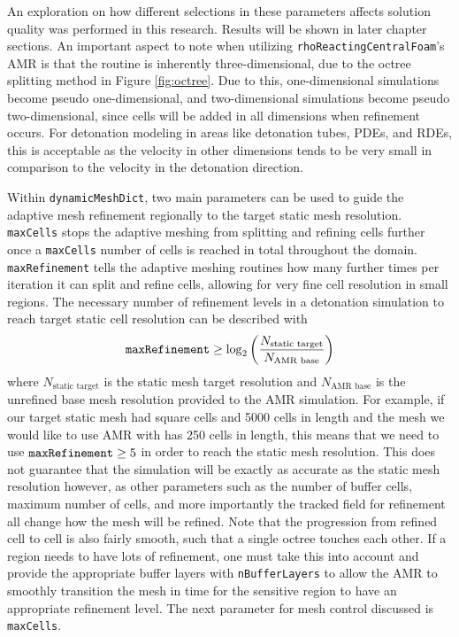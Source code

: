 An exploration on how different selections in these parameters affects solution quality was performed in this research. Results will be shown in later chapter sections. An important aspect to note when utilizing \verb|rhoReactingCentralFoam|'s AMR is that the routine is inherently three-dimensional, due to the octree splitting method in Figure \ref{fig:octree}. Due to this, one-dimensional simulations become pseudo one-dimensional, and two-dimensional simulations become pseudo two-dimensional, since cells will be added in all dimensions when refinement occurs. For detonation modeling in areas like detonation tubes, PDEs, and RDEs, this is acceptable as the velocity in other dimensions tends to be very small in comparison to the velocity in the detonation direction. 

Within \verb|dynamicMeshDict|, two main parameters can be used to guide the adaptive mesh refinement regionally to the target static mesh resolution. \verb|maxCells| stops the adaptive meshing from splitting and refining cells further once a \verb|maxCells| number of cells is reached in total throughout the domain. \verb|maxRefinement| tells the adaptive meshing routines how many further times per iteration it can split and refine cells, allowing for very fine cell resolution in small regions. The necessary number of refinement levels in a detonation simulation to reach target static cell resolution can be described with 
\begin{equation}
\verb|maxRefinement| \geq \log_2\left(\frac{N_{\text{static target}}}{N_{\text{AMR base}}}\right)
\end{equation}
where \(N_{\text{static target}}\) is the static mesh target resolution and \(N_{\text{AMR base}}\) is the unrefined base mesh resolution provided to the AMR simulation. For example, if our target static mesh had square cells and 5000 cells in length and the mesh we would like to use AMR with has 250 cells in length, this means that we need to use \(\verb|maxRefinement|\geq 5\) in order to reach the static mesh resolution. This does not guarantee that the simulation will be exactly as accurate as the static mesh resolution however, as other parameters such as the number of buffer cells, maximum number of cells, and more importantly the tracked field for refinement all change how the mesh will be refined. Note that the progression from refined cell to cell is also fairly smooth, such that a single octree touches each other. If a region needs to have lots of refinement, one must take this into account and provide the appropriate buffer layers with \verb|nBufferLayers| to allow the AMR to smoothly transition the mesh in time for the sensitive region to have an appropriate refinement level. The next parameter for mesh control discussed is \verb|maxCells|. 
